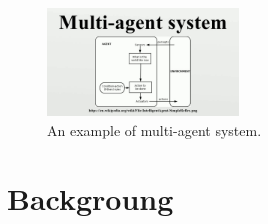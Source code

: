 \documentclass[journal]{IEEEtran}
\begin{document}
\begin{figure}[!h]
\begin{center}
\includegraphics[width=2in]{one.jpg}
\caption{An example of multi-agent system.}
\end{center}
\label{fig:mypicture1}
\end{figure}




\section{Backgroung}
\end{document}
